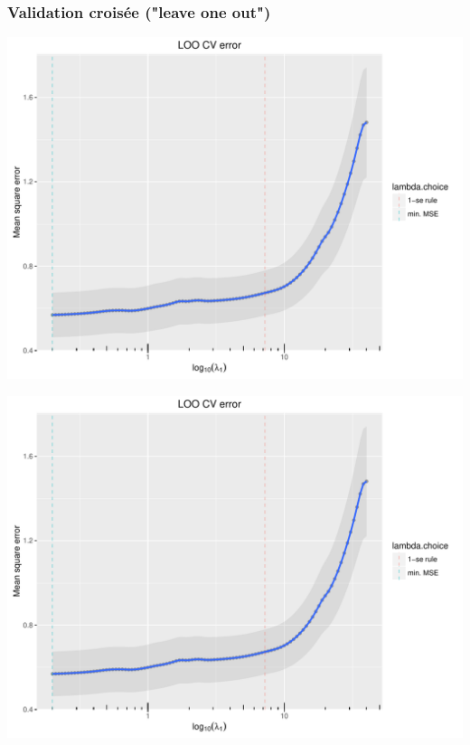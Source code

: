 \documentclass{beamer}\usepackage[]{graphicx}\usepackage[]{color}
\newenvironment{knitrout}{}{} %
\begin{document}
\begin{frame}[containsverbatim]
  \frametitle{Validation croisée ("leave one out")}
\begin{knitrout}\scriptsize
{}\color{fgcolor}
\includegraphics[width=\textwidth]{figures/crit_lassounnamed-chunk-74-1} 

\includegraphics[width=\textwidth]{figures/crit_lassounnamed-chunk-74-2} 

\end{knitrout}
\end{frame}
\end{document}
